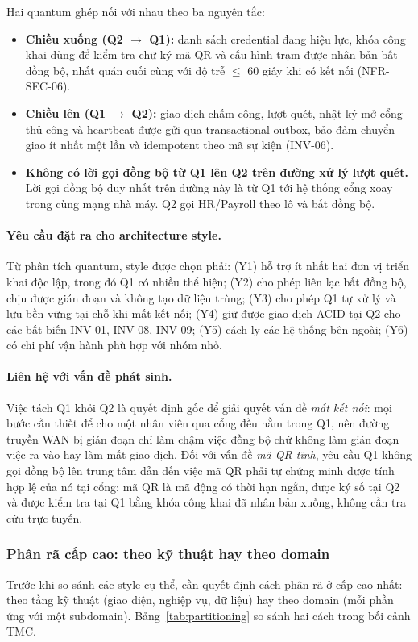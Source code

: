 Hai quantum ghép nối với nhau theo ba nguyên tắc:
\begin{itemize}
    \item \textbf{Chiều xuống (Q2 $\rightarrow$ Q1):} danh sách credential đang hiệu lực, khóa công khai dùng để kiểm tra chữ ký mã QR và cấu hình trạm được nhân bản bất đồng bộ, nhất quán cuối cùng với độ trễ $\le$ 60 giây khi có kết nối (NFR-SEC-06).
    \item \textbf{Chiều lên (Q1 $\rightarrow$ Q2):} giao dịch chấm công, lượt quét, nhật ký mở cổng thủ công và heartbeat được gửi qua transactional outbox, bảo đảm chuyển giao ít nhất một lần và idempotent theo mã sự kiện (INV-06).
    \item \textbf{Không có lời gọi đồng bộ từ Q1 lên Q2 trên đường xử lý lượt quét.} Lời gọi đồng bộ duy nhất trên đường này là từ Q1 tới hệ thống cổng xoay trong cùng mạng nhà máy. Q2 gọi HR/Payroll theo lô và bất đồng bộ.
\end{itemize}

\paragraph{Yêu cầu đặt ra cho architecture style.} Từ phân tích quantum, style được chọn phải: (Y1) hỗ trợ ít nhất hai đơn vị triển khai độc lập, trong đó Q1 có nhiều thể hiện; (Y2) cho phép liên lạc bất đồng bộ, chịu được gián đoạn và không tạo dữ liệu trùng; (Y3) cho phép Q1 tự xử lý và lưu bền vững tại chỗ khi mất kết nối; (Y4) giữ được giao dịch ACID tại Q2 cho các bất biến INV-01, INV-08, INV-09; (Y5) cách ly các hệ thống bên ngoài; (Y6) có chi phí vận hành phù hợp với nhóm nhỏ.

\paragraph{Liên hệ với vấn đề phát sinh.} Việc tách Q1 khỏi Q2 là quyết định gốc để giải quyết vấn đề \textit{mất kết nối}: mọi bước cần thiết để cho một nhân viên qua cổng đều nằm trong Q1, nên đường truyền WAN bị gián đoạn chỉ làm chậm việc đồng bộ chứ không làm gián đoạn việc ra vào hay làm mất giao dịch. Đối với vấn đề \textit{mã QR tĩnh}, yêu cầu Q1 không gọi đồng bộ lên trung tâm dẫn đến việc mã QR phải tự chứng minh được tính hợp lệ của nó tại cổng: mã QR là mã động có thời hạn ngắn, được ký số tại Q2 và được kiểm tra tại Q1 bằng khóa công khai đã nhân bản xuống, không cần tra cứu trực tuyến.

\subsubsection{Phân rã cấp cao: theo kỹ thuật hay theo domain}\label{sec:partitioning}
Trước khi so sánh các style cụ thể, cần quyết định cách phân rã ở cấp cao nhất: theo tầng kỹ thuật (giao diện, nghiệp vụ, dữ liệu) hay theo domain (mỗi phần ứng với một subdomain). Bảng~\ref{tab:partitioning} so sánh hai cách trong bối cảnh TMC.

